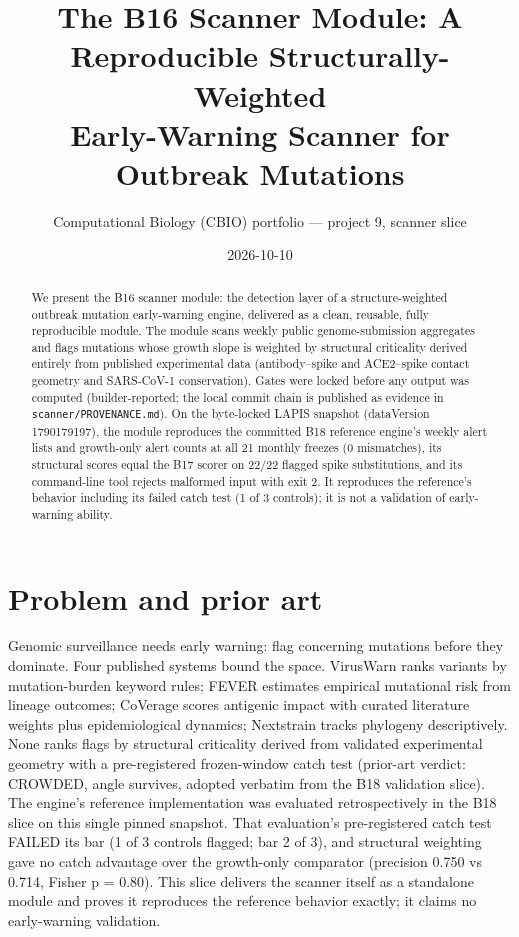 \documentclass[11pt]{article}
\title{The B16 Scanner Module: A Reproducible Structurally-Weighted\\Early-Warning Scanner for Outbreak Mutations}
\author{Computational Biology (CBIO) portfolio --- project 9, scanner slice}
\date{2026-10-10}
\begin{document}
\maketitle
\begin{abstract}
We present the B16 scanner module: the detection layer of a structure-weighted
outbreak mutation early-warning engine, delivered as a clean, reusable,
fully reproducible module. The module scans weekly public genome-submission
aggregates and flags mutations whose growth slope is weighted by structural
criticality derived entirely from published experimental data (antibody--spike
and ACE2--spike contact geometry and SARS-CoV-1 conservation). Gates were
locked before any output was computed (builder-reported; the local commit
chain is published as evidence in \texttt{scanner/PROVENANCE.md}). On the
byte-locked LAPIS snapshot (dataVersion 1790179197), the module reproduces
the committed B18 reference engine's weekly alert lists and growth-only
alert counts at all 21 monthly freezes (0 mismatches), its structural scores
equal the B17 scorer on 22/22 flagged spike substitutions, and its
command-line tool rejects malformed input with exit 2. It reproduces the
reference's behavior including its failed catch test (1 of 3 controls);
it is not a validation of early-warning ability.
\end{abstract}

\section{Problem and prior art}
Genomic surveillance needs early warning: flag concerning mutations before they
dominate. Four published systems bound the space. VirusWarn ranks variants by
mutation-burden keyword rules; FEVER estimates empirical mutational risk from
lineage outcomes; CoVerage scores antigenic impact with curated literature
weights plus epidemiological dynamics; Nextstrain tracks phylogeny descriptively.
None ranks flags by structural criticality derived from validated experimental
geometry with a pre-registered frozen-window catch test (prior-art verdict:
CROWDED, angle survives, adopted verbatim from the B18 validation slice).
The engine's reference implementation was evaluated retrospectively in the B18
slice on this single pinned snapshot. That evaluation's pre-registered catch
test FAILED its bar (1 of 3 controls flagged; bar 2 of 3), and structural
weighting gave no catch advantage over the growth-only comparator (precision
0.750 vs 0.714, Fisher p = 0.80). This slice delivers the scanner itself as a
standalone module and proves it reproduces the reference behavior exactly;
it claims no early-warning validation.
\end{document}
